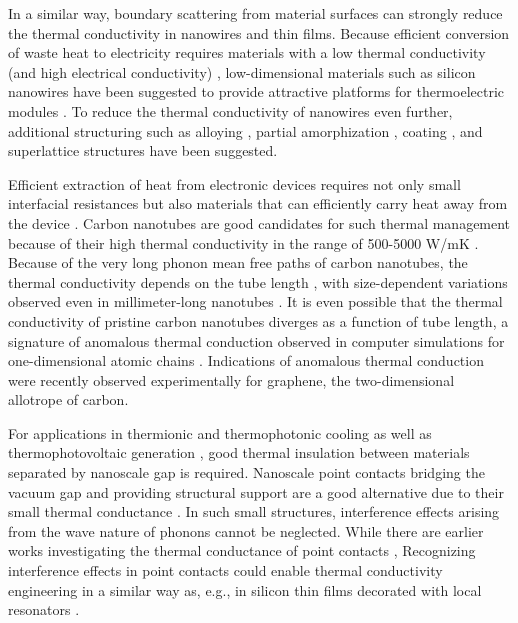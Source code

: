 In a similar way, boundary scattering from material surfaces can strongly reduce the thermal conductivity in nanowires and thin films. Because efficient conversion of waste heat to electricity requires materials with a low thermal conductivity (and high electrical conductivity) \cite{chen}, low-dimensional materials such as silicon nanowires have been suggested to provide attractive platforms for thermoelectric modules \cite{hochbaum08,boukai08}. To reduce the thermal conductivity of nanowires even further, additional structuring such as alloying \cite{garg11}, partial amorphization \cite{donadio09}, coating \cite{hu11}, and superlattice structures \cite{hu12} have been suggested.

Efficient extraction of heat from electronic devices requires not only small interfacial resistances but also materials that can efficiently carry heat away from the device \cite{pop10}. Carbon nanotubes  \cite{iijima91} are good candidates for such thermal management \cite{kumar11} because of their high thermal conductivity in the range of 500-5000 W/mK \cite{marconnet13}. Because of the very long phonon mean free paths of carbon nanotubes, the thermal conductivity depends on the tube length \cite{chang08}, with size-dependent variations observed even in millimeter-long nanotubes \cite{chang_personal}. It is even possible that the thermal conductivity of pristine carbon nanotubes diverges as a function of tube length, a signature of anomalous thermal conduction observed in computer simulations for one-dimensional atomic chains \cite{lepri03,mai07,dhar08}. Indications of anomalous thermal conduction were recently observed experimentally \cite{xu14} for graphene, the two-dimensional allotrope of carbon.

For applications in thermionic \cite{zeng06,westover08} and thermophotonic \cite{oksanen08} cooling as well as thermophotovoltaic generation \cite{dimatteo01}, good thermal insulation between materials separated by nanoscale gap is required. Nanoscale point contacts bridging the vacuum gap and providing structural support are a good alternative due to their small thermal conductance \cite{bartsch12}. In such small structures, interference effects arising from the wave nature of phonons cannot be neglected. While there are earlier works investigating the thermal conductance of point contacts \cite{bartsch12,jeong12},  Recognizing interference effects in point contacts could enable thermal conductivity engineering in a similar way as, e.g., in silicon thin films decorated with local resonators \cite{davis14}.

